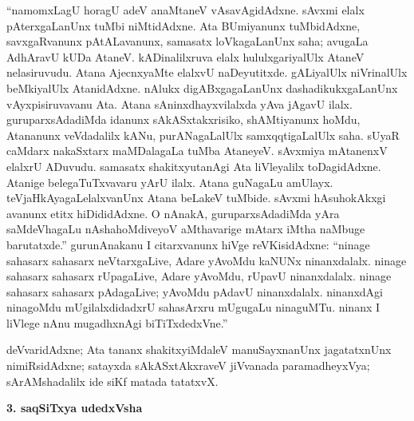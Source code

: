 ``namomxLagU horagU adeV anaMtaneV vAsavAgidAdxne. sAvxmi elalx pAterxgaLanUnx tuMbi niMtidAdxne. Ata BUmiyanunx tuMbidAdxne, savxgaRvanunx pAtALavanunx, samasatx loVkagaLanUnx saha; avugaLa AdhAravU kUDa AtaneV. kADinalilxruva elalx hululxgariyalUlx AtaneV nelasiruvudu. Atana AjecnxyaMte elalxvU naDeyutitxde. gALiyalUlx niVrinalUlx beMkiyalUlx AtanidAdxne. nAlukx digABxgagaLanUnx dashadikukxgaLanUnx vAyxpisiruvavanu Ata. Atana sAninxdhayxvilalxda yAva jAgavU ilalx. guruparxsAdadiMda idanunx sAkASxtakxrisiko, shAMtiyanunx hoMdu, Atananunx veVdadalilx kANu, purANagaLalUlx samxqqtigaLalUlx saha. sUyaR caMdarx nakaSxtarx maMDalagaLa tuMba AtaneyeV. sAvxmiya mAtanenxV elalxrU ADuvudu. samasatx shakitxyutanAgi Ata liVleyalilx toDagidAdxne. Atanige belegaTuTxvavaru yArU ilalx. Atana guNagaLu amUlayx. teVjaHkAyagaLelalxvanUnx Atana beLakeV tuMbide. sAvxmi hAsuhokAkxgi avanunx etitx hiDididAdxne. O nAnakA, guruparxsAdadiMda yAra saMdeVhagaLu nAshahoMdiveyoV aMthavarige mAtarx iMtha naMbuge barutatxde.'' gurunAnakanu I citarxvanunx hiVge reVKisidAdxne: ``ninage sahasarx sahasarx neVtarxgaLive, Adare yAvoMdu kaNUNx ninanxdalalx. ninage sahasarx sahasarx rUpagaLive, Adare yAvoMdu, rUpavU ninanxdalalx. ninage sahasarx sahasarx pAdagaLive; yAvoMdu pAdavU ninanxdalalx. ninanxdAgi ninagoMdu mUgilalxdidadxrU sahasArxru mUgugaLu ninaguMTu. ninanx I liVlege nAnu mugadhxnAgi biTiTxdedxVne.''

deVvaridAdxne; Ata tananx shakitxyiMdaleV manuSayxnanUnx jagatatxnUnx nimiRsidAdxne; satayxda sAkASxtAkxraveV jiVvanada paramadheyxVya; sArAMshadalilx ide siKf matada tatatxvX.

\newpage

\begin{center}
{\Large\bf 3. saqSiTxya udedxVsha}
\end{center}

